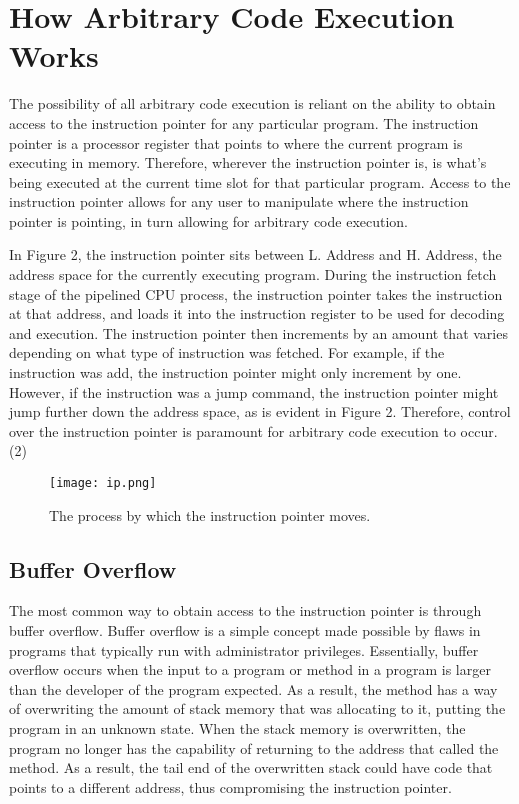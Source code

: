 \section{How Arbitrary Code Execution Works}

The possibility of all arbitrary code execution is reliant on the ability to obtain access to the instruction pointer for any particular program. The instruction pointer is a processor register that points to where the current program is executing in memory. Therefore, wherever the instruction pointer is, is what’s being executed at the current time slot for that particular program. Access to the instruction pointer allows for any user to manipulate where the instruction pointer is pointing, in turn allowing for arbitrary code execution. 


In Figure 2, the instruction pointer sits between L. Address and H. Address, the address space for the currently executing program. During the instruction fetch stage of the pipelined CPU process, the instruction pointer takes the instruction at that address, and loads it into the instruction register to be used for decoding and execution. The instruction pointer then increments by an amount that varies depending on what type of instruction was fetched. For example, if the instruction was add, the instruction pointer might only increment by one. However, if the instruction was a jump command, the instruction pointer might jump further down the address space, as is evident in Figure 2. Therefore, control over the instruction pointer is paramount for arbitrary code execution to occur. (2)

\begin{figure}
\texttt{[image: ip.png]}
\caption{The process by which the instruction pointer moves.}
\end{figure}

\subsection{Buffer Overflow}

The most common way to obtain access to the instruction pointer is through buffer overflow. Buffer overflow is a simple concept made possible by flaws in programs that typically run with administrator privileges. Essentially, buffer overflow occurs when the input to a program or method in a program is larger than the developer of the program expected. As a result, the method has a way of overwriting the amount of stack memory that was allocating to it, putting the program in an unknown state. When the stack memory is overwritten, the program no longer has the capability of returning to the address that called the method. As a result, the tail end of the overwritten stack could have code that points to a different address, thus compromising the instruction pointer.


